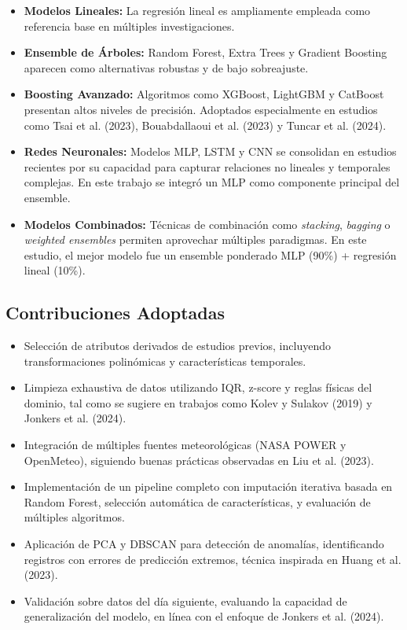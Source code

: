 \documentclass[conference]{IEEEtran}
\begin{document}
\begin{itemize}
	\item \textbf{Modelos Lineales:} La regresión lineal es ampliamente empleada como referencia base en múltiples investigaciones.
	
	\item \textbf{Ensemble de Árboles:} Random Forest, Extra Trees y Gradient Boosting aparecen como alternativas robustas y de bajo sobreajuste.
	
	\item \textbf{Boosting Avanzado:} Algoritmos como XGBoost, LightGBM y CatBoost presentan altos niveles de precisión. Adoptados especialmente en estudios como Tsai et al. (2023), Bouabdallaoui et al. (2023) y Tuncar et al. (2024).
	
	\item \textbf{Redes Neuronales:} Modelos MLP, LSTM y CNN se consolidan en estudios recientes por su capacidad para capturar relaciones no lineales y temporales complejas. En este trabajo se integró un MLP como componente principal del ensemble.
	
	\item \textbf{Modelos Combinados:} Técnicas de combinación como \textit{stacking}, \textit{bagging} o \textit{weighted ensembles} permiten aprovechar múltiples paradigmas. En este estudio, el mejor modelo fue un ensemble ponderado MLP (90\%) + regresión lineal (10\%).
\end{itemize}

\subsection{Contribuciones Adoptadas}

\begin{itemize}
	\item Selección de atributos derivados de estudios previos, incluyendo transformaciones polinómicas y características temporales.
	
	\item Limpieza exhaustiva de datos utilizando IQR, z-score y reglas físicas del dominio, tal como se sugiere en trabajos como Kolev y Sulakov (2019) y Jonkers et al. (2024).
	
	\item Integración de múltiples fuentes meteorológicas (NASA POWER y OpenMeteo), siguiendo buenas prácticas observadas en Liu et al. (2023).
	
	\item Implementación de un pipeline completo con imputación iterativa basada en Random Forest, selección automática de características, y evaluación de múltiples algoritmos.
	
	\item Aplicación de PCA y DBSCAN para detección de anomalías, identificando registros con errores de predicción extremos, técnica inspirada en Huang et al. (2023).
	
	\item Validación sobre datos del día siguiente, evaluando la capacidad de generalización del modelo, en línea con el enfoque de Jonkers et al. (2024).
\end{itemize}
\end{document}

